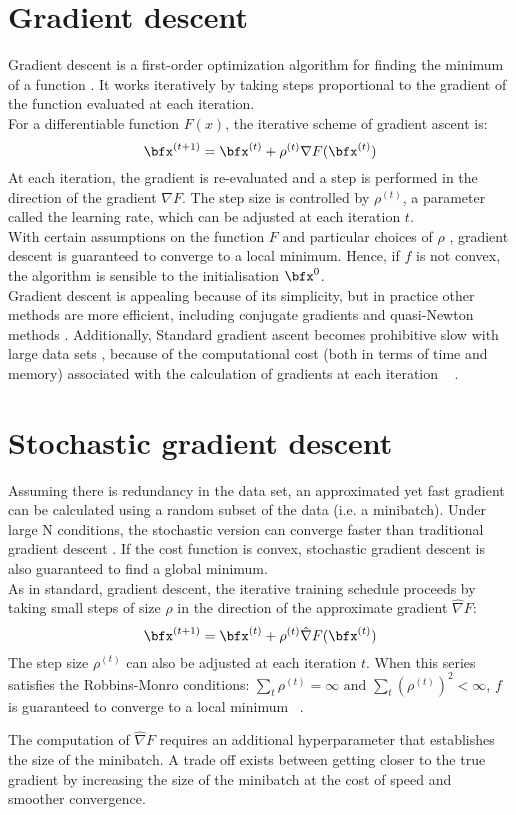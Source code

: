 \section{Gradient descent}
Gradient descent is a first-order optimization algorithm for finding the minimum of a function \cite{??}. It works iteratively by taking steps proportional to the gradient of the function evaluated at each iteration.\\

For a differentiable function $F(x)$, the iterative scheme of gradient ascent is:
\begin{equation}
\bfx^{(t+1)} = \bfx^{(t)} + \rho^{(t)} \nabla F(\bfx^{(t)})
\end{equation}
At each iteration, the gradient is re-evaluated and a step is performed in the direction of the gradient $\nabla F$. The step size is controlled by $\rho^{(t)}$, a parameter called the learning rate, which can be adjusted at each iteration $t$. \\
With certain assumptions on the function $F$ and particular choices of $\rho$ \cite{??}, gradient descent is guaranteed to converge to a local minimum. Hence, if $f$ is not convex, the algorithm is sensible to the initialisation $\bfx^0$.  \\

Gradient descent is appealing because of its simplicity, but in practice other methods are more efficient, including conjugate gradients and quasi-Newton methods \cite{Gill et al., 1981; Fletcher, 1987; Nocedal and Wright, 1999}. Additionally, Standard gradient ascent becomes prohibitive slow with large data sets \cite{}, because of the computational cost (both in terms of time and memory) associated with the calculation of gradients at each iteration ~\citep{Robbins-Monro1951, Bottou2011-by, Spall2003-fl} .


\section{Stochastic gradient descent}
Assuming  there is redundancy in the data set, an approximated yet fast gradient can be calculated using a random subset of the data (i.e. a minibatch). Under large N conditions, the stochastic version can converge faster than traditional gradient descent \cite{??}. If the cost function is convex, stochastic gradient descent is also guaranteed to find a global minimum. \\

As in standard, gradient descent, the iterative training schedule proceeds by taking small steps of size $\rho$ in the direction of the approximate gradient $\hat{\nabla}F$:
\begin{equation}
\bfx^{(t+1)} = \bfx^{(t)} + \rho^{(t)} \hat{\nabla} F(\bfx^{(t)})
\end{equation}
The step size $\rho^{(t)}$ can also be adjusted at each iteration $t$. When this series satisfies the Robbins-Monro conditions: $\sum_t \rho^{(t)} = \infty \text{ and } \sum_t (\rho^{(t)})^2 < \infty$, $f$ is guaranteed to converge to a local minimum ~\citep{Robbins-Monro1951}. 

The computation of $\hat{\nabla}F$ requires an additional hyperparameter that establishes the size of the minibatch. A trade off exists between getting closer to the true gradient by increasing the size of the minibatch at the cost of speed and smoother convergence.

